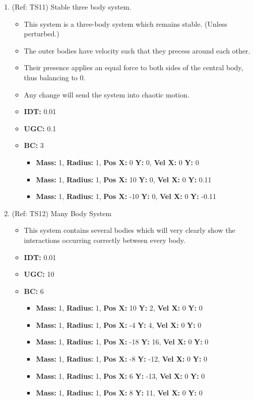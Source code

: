 \begin{enumerate}
\vspace{12pt}  
\item (Ref: TS11) Stable three body system.
  \begin{itemize}
  \item This system is a three-body system which remains stable. (Unless perturbed.)
  \item The outer bodies have velocity such that they precess around each other.
  \item Their presence applies an equal force to both sides of the central body, thus balancing to 0.
  \item Any change will send the system into chaotic motion.
  \item \textbf{IDT:} 0.01
  \item \textbf{UGC:} 0.1 
  \item \textbf{BC:} 3
    \begin{itemize}
    \item \textbf{Mass:} 1, \textbf{Radius:} 1, \textbf{Pos X:} 0 \textbf{Y:} 0, \textbf{Vel X:} 0 \textbf{Y:} 0
    \item \textbf{Mass:} 1, \textbf{Radius:} 1, \textbf{Pos X:} 10 \textbf{Y:} 0, \textbf{Vel X:} 0 \textbf{Y:} 0.11
    \item \textbf{Mass:} 1, \textbf{Radius:} 1, \textbf{Pos X:} -10 \textbf{Y:} 0, \textbf{Vel X:} 0 \textbf{Y:} -0.11
    \end{itemize}
  \end{itemize}
  
\pagebreak 
\item (Ref: TS12) Many Body System
  \begin{itemize}
  \item This system contains several bodies which will very clearly show the interactions occurring correctly between every body.
  \item \textbf{IDT:} 0.01
  \item \textbf{UGC:} 10
  \item \textbf{BC:} 6
    \begin{itemize}
    \item \textbf{Mass:} 1, \textbf{Radius:} 1, \textbf{Pos X:} 10 \textbf{Y:} 2, \textbf{Vel X:} 0 \textbf{Y:} 0
    \item \textbf{Mass:} 1, \textbf{Radius:} 1, \textbf{Pos X:} -4 \textbf{Y:} 4, \textbf{Vel X:} 0 \textbf{Y:} 0
    \item \textbf{Mass:} 1, \textbf{Radius:} 1, \textbf{Pos X:} -18 \textbf{Y:} 16, \textbf{Vel X:} 0 \textbf{Y:} 0
    \item \textbf{Mass:} 1, \textbf{Radius:} 1, \textbf{Pos X:} -8 \textbf{Y:} -12, \textbf{Vel X:} 0 \textbf{Y:} 0
    \item \textbf{Mass:} 1, \textbf{Radius:} 1, \textbf{Pos X:} 6 \textbf{Y:} -13, \textbf{Vel X:} 0 \textbf{Y:} 0
    \item \textbf{Mass:} 1, \textbf{Radius:} 1, \textbf{Pos X:} 8 \textbf{Y:} 11, \textbf{Vel X:} 0 \textbf{Y:} 0
    \end{itemize}
  \end{itemize}
\end{enumerate}